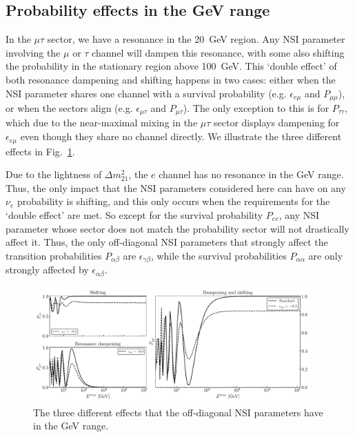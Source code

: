 \documentclass[draft=True]{revtex4-2}
\newcommand{\emt}{\ensuremath{\epsilon_{\mu\tau}}}
\newcommand{\eem}{\epsilon_{e\mu}}
\begin{document}
\subsection{Probability effects in the GeV range}
In the $\mu\tau$ sector, we have a resonance in the \SI{20}{\GeV} region. Any NSI parameter involving the $\mu$ or $\tau$ channel will dampen this resonance,
with some also shifting the probability in the stationary region above \SI{100}{\GeV}.
This `double effect' of both resonance dampening and shifting happens in two cases: either when the NSI parameter shares one channel with a survival probability
(e.g. $\eem$ and $P_{\mu\mu}$), or when the sectors align (e.g. $\emt$ and $P_{\mu\tau}$). The only exception to this is for $P_{\tau\tau}$, 
which due to the near-maximal mixing in the $\mu\tau$ sector displays dampening for $\eem$ even though they share no channel directly. We illustrate
the three different effects in Fig.~\ref{fig:nsi_probs}. 

Due to the lightness of $\Delta m^2_{21}$, the $e$ channel has no resonance in the \si{\GeV} range. Thus, the only impact that 
the NSI parameters considered here can have on any $\nu_e$ probability is shifting, and this only occurs when the requirements for the `double effect'
are met. So except for the survival probability $P_{ee}$, any NSI parameter whose sector does not match the probability sector will not drastically affect it. 
Thus, the only off-diagonal NSI parameters that strongly affect the transition probabilities $P_{\alpha\beta}$ are $\epsilon_{\gamma\beta}$,
while the survival probabilities $P_{\alpha\alpha}$ are only strongly affected by $\epsilon_{\alpha\beta}$.
\begin{figure}
   \includegraphics[width=0.95\textwidth]{figures/nsi_probs.pdf}
   \caption{The three different effects that the off-diagonal NSI parameters have in the \si{\GeV} range.}\label{fig:nsi_probs}
\end{figure}
\end{document}
